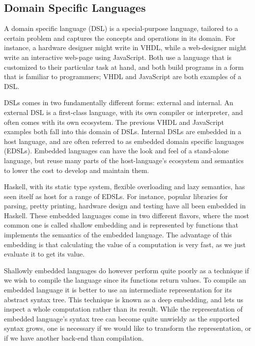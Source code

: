 \subsection{Domain Specific Languages}

A domain specific language (DSL) is a special-purpose language, tailored to a certain problem and captures the concepts and operations in its domain. For instance, a hardware designer might write in VHDL, while a web-designer might write an interactive web-page using JavaScript. Both use a language that is customized to their particular task at hand, and both build programs in a form that is familiar to programmers; VHDL and JavaScript are both examples of a DSL.

DSLs comes in two fundamentally different forms: external and internal. An external DSL is a first-class language, with its own compiler or interpreter, and often comes with its own ecosystem. The previous VHDL and JavaScript examples both fall into this domain of DSLs. Internal DSLs are embedded in a host language, and are often referred to as embedded domain specific languages (EDSLs). Embedded languages can have the look and feel of a stand-alone language, but reuse many parts of the host-language's ecosystem and semantics to lower the cost to develop and maintain them.

Haskell, with its static type system, flexible overloading and lazy semantics, has seen itself as host for a range of EDSLs. For instance, popular libraries for parsing, pretty printing, hardware design and testing have all been embedded in Haskell. These embedded languages come in two different flavors, where the most common one is called shallow embedding and is represented by functions that implements the semantics of the embedded language. The advantage of this embedding is that calculating the value of a computation is very fast, as we just evaluate it to get its value.

Shallowly embedded languages do however perform quite poorly as a technique if we wish to compile the language since its functions return values. To compile an embedded language it is better to use an intermediate representation for its abstract syntax tree. This technique is known as a deep embedding, and lets us inspect a whole computation rather than its result. While the representation of embedded language's syntax tree can become quite unwieldy as the supported syntax grows, one is necessary if we would like to transform the representation, or if we have another back-end than compilation.

